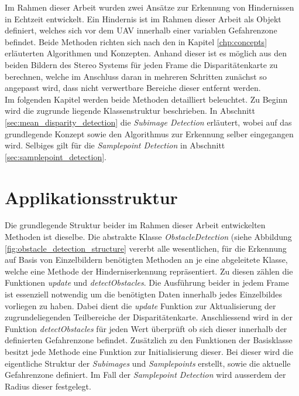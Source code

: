 Im Rahmen dieser Arbeit wurden zwei Ansätze zur Erkennung von Hindernissen in Echtzeit entwickelt. Ein Hindernis ist im Rahmen dieser Arbeit als Objekt definiert, welches sich vor dem UAV innerhalb einer variablen Gefahrenzone befindet. Beide Methoden richten sich nach den in Kapitel \ref{chp:concepts} erläuterten Algorithmen und Konzepten. Anhand dieser ist es möglich aus den beiden Bildern des Stereo Systems für jeden Frame die Disparitätenkarte zu berechnen, welche im Anschluss daran in mehreren Schritten zunächst so angepasst wird, dass nicht verwertbare Bereiche dieser entfernt werden.\\

\noindent
Im folgenden Kapitel werden beide Methoden detailliert beleuchtet. Zu Beginn wird die zugrunde liegende Klassenstruktur beschrieben. In Abschnitt \ref{sec:mean_disparity_detection} die \emph{Subimage Detection} erläutert, wobei auf das grundlegende Konzept sowie den Algorithmus zur Erkennung selber eingegangen wird. Selbiges gilt für die \emph{Samplepoint Detection} in Abschnitt \ref{sec:samplepoint_detection}.

\section{Applikationsstruktur}
\label{sec:structure}

Die grundlegende Struktur beider im Rahmen dieser Arbeit entwickelten Methoden ist dieselbe. Die abstrakte Klasse \emph{ObstacleDetection} (siehe Abbildung \ref{fig:obstacle_detection_structure} vererbt alle wesentlichen, für die Erkennung auf Basis von Einzelbildern benötigten Methoden an je eine abgeleitete Klasse, welche eine Methode der Hinderniserkennung repräsentiert. Zu diesen zählen die Funktionen \emph{update} und \emph{detectObstacles}. Die Ausführung beider in jedem Frame ist essenziell notwendig um die benötigten Daten innerhalb jedes Einzelbildes vorliegen zu haben. Dabei dient die \emph{update} Funktion zur Aktualisierung der zugrundeliegenden Teilbereiche der Disparitätenkarte. Anschliessend wird in der Funktion \emph{detectObstacles} für jeden Wert überprüft ob sich dieser innerhalb der definierten Gefahrenzone befindet. Zusätzlich zu den Funktionen der Basisklasse besitzt jede Methode eine Funktion zur Initialisierung dieser. Bei dieser wird die eigentliche Struktur der \emph{Subimages} und \emph{Samplepoints} erstellt, sowie die aktuelle Gefahrenzone definiert. Im Fall der \emph{Samplepoint Detection} wird ausserdem der Radius dieser festgelegt.

